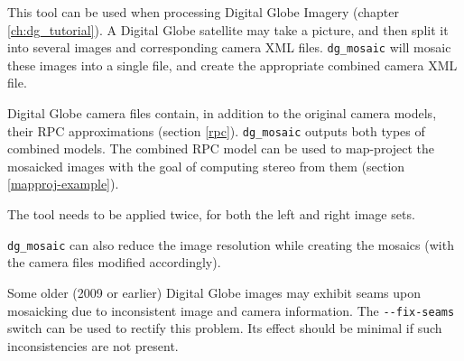 This tool can be used when processing Digital Globe Imagery (chapter
\ref{ch:dg_tutorial}). A Digital Globe satellite may take a
picture, and then split it into several images and corresponding camera
XML files. \texttt{dg\_mosaic} will mosaic these images into a single
file, and create the appropriate combined camera XML file.

Digital Globe camera files contain, in addition to the original camera
models, their RPC approximations (section
\ref{rpc}). \texttt{dg\_mosaic} outputs both types of combined
models. The combined RPC model can be used to map-project the mosaicked
images with the goal of computing stereo from them (section
\ref{mapproj-example}).

The tool needs to be applied twice, for both the left and right image sets.

\texttt{dg\_mosaic} can also reduce the image resolution while creating the
mosaics (with the camera files modified accordingly).

Some older (2009 or earlier) Digital Globe images may exhibit seams upon mosaicking
due to inconsistent image and camera information. The \texttt{-\/-fix-seams} switch
can be used to rectify this problem. Its effect should be minimal if such inconsistencies
are not present.

